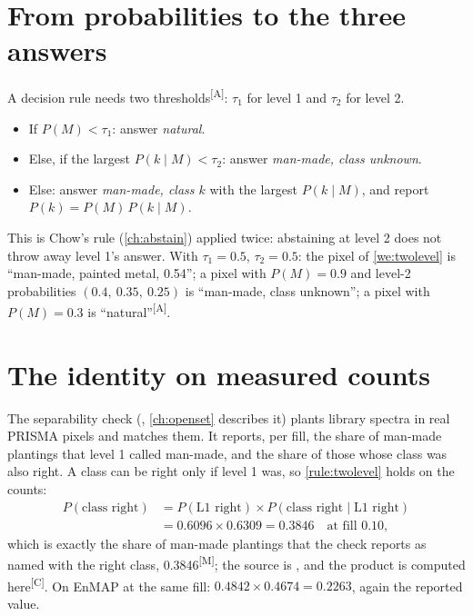 \documentclass[11pt,a4paper,oneside,openany]{book}
\newcommand{\meas}{\textsuperscript{\textsf{\scriptsize[M]}}}
\newcommand{\comp}{\textsuperscript{\textsf{\scriptsize[C]}}}
\newcommand{\assm}{\textsuperscript{\textsf{\scriptsize[A]}}}
\begin{document}
\section{From probabilities to the three answers}

A decision rule needs two thresholds\assm: $\tau_1$ for level 1 and $\tau_2$ for level 2.
\begin{itemize}
\item If $P(M)<\tau_1$: answer \emph{natural}.
\item Else, if the largest $P(k\mid M)<\tau_2$: answer \emph{man-made, class unknown}.
\item Else: answer \emph{man-made, class $k$} with the largest $P(k\mid M)$, and report $P(k)=P(M)\,P(k\mid M)$.
\end{itemize}
This is Chow's rule (\cref{ch:abstain}) applied twice: abstaining at level 2 does not throw away level 1's answer. With $\tau_1=0.5$, $\tau_2=0.5$: the pixel of
\cref{we:twolevel} is ``man-made, painted metal, 0.54''; a pixel with $P(M)=0.9$ and level-2 probabilities $(0.4,\ 0.35,\ 0.25)$ is ``man-made, class unknown''; a pixel
with $P(M)=0.3$ is ``natural''\assm.

\section{The identity on measured counts}

The separability check (, \cref{ch:openset} describes it) plants library spectra in real PRISMA pixels and
matches them. It reports, per fill, the share of man-made plantings that level 1 called man-made, and the share of those whose class was also right. A class can be right
only if level 1 was, so \cref{rule:twolevel} holds on the counts:
\begin{align*}
P(\text{class right}) &= P(\text{L1 right})\times P(\text{class right}\mid\text{L1 right})\\
 &= 0.6096\times0.6309=0.3846 \quad\text{at fill 0.10,}
\end{align*}
which is exactly the share of man-made plantings that the check reports as named with the right class, 0.3846\meas; the source is
, and the product is computed here\comp. On EnMAP at the same fill: $0.4842\times0.4674=0.2263$, again the reported value.
\end{document}
